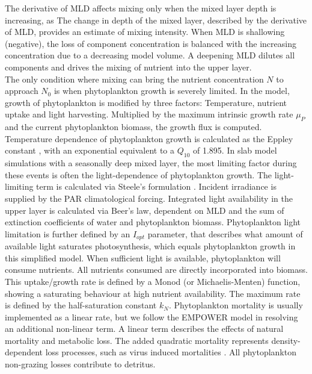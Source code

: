 \documentclass[journal abbreviation, manuscript]{copernicus}
\begin{document}
The derivative of MLD affects mixing only when the mixed layer depth is increasing, as 
The change in depth of the mixed layer, described by the derivative of MLD, provides an estimate of mixing intensity. When MLD is shallowing (negative), the loss of component concentration is balanced with the increasing concentration due to a decreasing model volume. A deepening MLD dilutes all components and drives the mixing of nutrient into the upper layer. \\

The only condition where mixing can bring the nutrient concentration $N$ to approach $N_0$ is when phytoplankton growth is severely limited. In the model, growth of phytoplankton is modified by three factors: Temperature, nutrient uptake and light harvesting. Multiplied by the maximum intrinsic growth rate $\mu_P$ and the current phytoplankton biomass, the growth flux is computed. Temperature dependence of phytoplankton growth is calculated as the Eppley constant \citep{Eppley1972TemperatureSea}, with an exponential equivalent to a $Q_{10}$ of 1.895.
In slab model simulations with a seasonally deep mixed layer, the most limiting factor during these events is often the light-dependence of phytoplankton growth. The light-limiting term is calculated via Steele's formulation \citep{Steele1962EnvironmentalSea}. Incident irradiance is supplied by the PAR climatological forcing. Integrated light availability in the upper layer is calculated via Beer's law, dependent on MLD and the sum of extinction coefficients of water and phytoplankton biomass. Phytoplankton light limitation is further defined by an $I_{opt}$ parameter, that describes what amount of available light saturates photosynthesis, which equals phytoplankton growth in this simplified model.
When sufficient light is available, phytoplankton will consume nutrients. All nutrients consumed are directly incorporated into biomass. This uptake/growth rate is defined by a Monod (or Michaelis-Menten) function, showing a saturating behaviour at high nutrient availability. The maximum rate is defined by the half-saturation constant $k_N$. 
Phytoplankton mortality is usually implemented as a linear rate, but we follow the EMPOWER model in resolving an additional non-linear term. A linear term describes the effects of natural mortality and metabolic loss. The added quadratic mortality represents density-dependent loss processes, such as virus induced mortalities \citep{Anderson2015c}.  
All phytoplankton non-grazing losses contribute to detritus.\\
\end{document}
